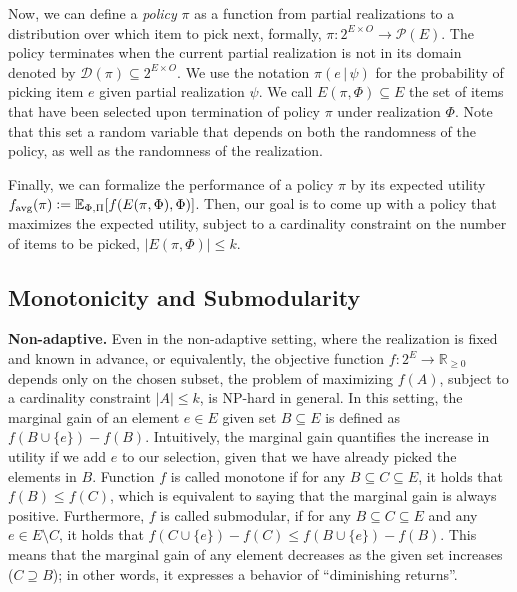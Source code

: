 \documentclass{article}
\newcommand{\favg}{f_{\mathrm{avg}}}
\newcommand{\dom}{\mathcal{D}}
\newcommand{\defeq}{\vcentcolon=}
\newcommand{\mmid}{\,\vert\,}
\renewcommand{\paragraph}[1]{\vspace{0.3em}\noindent\textbf{#1.}\makebox[0.5em]{}}
\begin{document}
Now, we can define a \emph{policy} $\pi$ as a function from partial realizations to a distribution over which item to pick next, formally, $\pi : 2^{E \times O} \to \mathcal{P}(E)$.
The policy terminates when the current partial realization is not in its domain denoted by $\dom(\pi) \subseteq 2^{E \times O}$.
We use the notation $\pi(e\mmid\psi)$ for the probability of picking item $e$ given partial realization $\psi$.
We call $E(\pi, \Phi) \subseteq E$ the set of items that have been selected upon termination of policy $\pi$ under realization $\Phi$.
Note that this set a random variable that depends on both the randomness of the policy, as well as the randomness of the realization.

Finally, we can formalize the performance of a policy $\pi$ by its expected utility $\favg(\pi) \defeq \E[\Phi,\Pi]{f(E(\pi, \Phi), \Phi)}$.
Then, our goal is to come up with a policy that maximizes the expected utility, subject to a cardinality constraint on the number of items to be picked, $|E(\pi, \Phi)| \leq k$.

\subsection{Monotonicity and Submodularity}
\paragraph{Non-adaptive}
Even in the non-adaptive setting, where the realization is fixed and known in advance, or equivalently, the objective function $f : 2^E \to \mathbb{R}_{\geq 0}$ depends only on the chosen subset, the problem of maximizing $f(A)$, subject to a cardinality constraint $|A| \leq k$, is NP-hard in general.
In this setting, the marginal gain of an element $e \in E$ given set $B \subseteq E$ is defined as $f(B \cup \{e\}) - f(B)$.
Intuitively, the marginal gain quantifies the increase in utility if we add $e$ to our selection, given that we have already picked the elements in $B$.
Function $f$ is called monotone if for any $B \subseteq C \subseteq E$, it holds that $f(B) \leq f(C)$, which is equivalent to saying that the marginal gain is always positive.
Furthermore, $f$ is called submodular, if for any $B \subseteq C \subseteq E$ and any $e \in E \setminus C$, it holds that $f(C \cup \{e\}) - f(C) \leq  f(B \cup \{e\}) - f(B)$.
This means that the marginal gain of any element decreases as the given set increases ($C \supseteq B$); in other words, it expresses a behavior of ``diminishing returns''.
\end{document}
